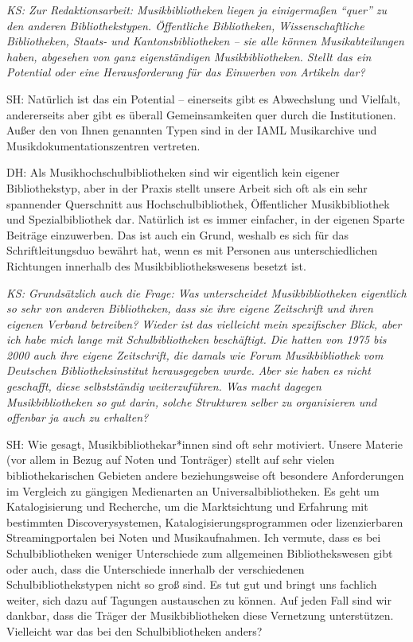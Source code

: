 \documentclass[a4paper,
fontsize=11pt,
oneside,
numbers=noperiodatend,
parskip=half-,
bibliography=totoc,
final
]{scrartcl}
\begin{document}
\emph{KS: Zur Redaktionsarbeit: Musikbibliotheken liegen ja einigermaßen
\enquote{quer} zu den anderen Bibliothekstypen. Öffentliche
Bibliotheken, Wissenschaftliche Bibliotheken, Staats- und
Kantonsbibliotheken -- sie alle können Musikabteilungen haben, abgesehen
von ganz eigenständigen Musikbibliotheken. Stellt das ein Potential oder
eine Herausforderung für das Einwerben von Artikeln dar?}

SH: Natürlich ist das ein Potential -- einerseits gibt es Abwechslung
und Vielfalt, andererseits aber gibt es überall Gemeinsamkeiten quer
durch die Institutionen. Außer den von Ihnen genannten Typen sind in der
IAML Musikarchive und Musikdokumentationszentren vertreten.

DH: Als Musikhochschulbibliotheken sind wir eigentlich kein eigener
Bibliothekstyp, aber in der Praxis stellt unsere Arbeit sich oft als ein
sehr spannender Querschnitt aus Hochschulbibliothek, Öffentlicher
Musikbibliothek und Spezialbibliothek dar. Natürlich ist es immer
einfacher, in der eigenen Sparte Beiträge einzuwerben. Das ist auch ein
Grund, weshalb es sich für das Schriftleitungsduo bewährt hat, wenn es
mit Personen aus unterschiedlichen Richtungen innerhalb des
Musikbibliothekswesens besetzt ist.

\emph{KS: Grundsätzlich auch die Frage: Was unterscheidet
Musikbibliotheken eigentlich so sehr von anderen Bibliotheken, dass sie
ihre eigene Zeitschrift und ihren eigenen Verband betreiben? Wieder ist
das vielleicht mein spezifischer Blick, aber ich habe mich lange mit
Schulbibliotheken beschäftigt. Die hatten von 1975 bis 2000 auch ihre
eigene Zeitschrift, die damals wie Forum Musikbibliothek vom Deutschen
Bibliotheksinstitut herausgegeben wurde. Aber sie haben es nicht
geschafft, diese selbstständig weiterzuführen. Was macht dagegen
Musikbibliotheken so gut darin, solche Strukturen selber zu organisieren
und offenbar ja auch zu erhalten?}

SH: Wie gesagt, Musikbibliothekar*innen sind oft sehr motiviert. Unsere
Materie (vor allem in Bezug auf Noten und Tonträger) stellt auf sehr
vielen bibliothekarischen Gebieten andere beziehungsweise oft besondere
Anforderungen im Vergleich zu gängigen Medienarten an
Universalbibliotheken. Es geht um Katalogisierung und Recherche, um die
Marktsichtung und Erfahrung mit bestimmten Discoverysystemen,
Katalogisierungsprogrammen oder lizenzierbaren Streamingportalen bei
Noten und Musikaufnahmen. Ich vermute, dass es bei Schulbibliotheken
weniger Unterschiede zum allgemeinen Bibliothekswesen gibt oder auch,
dass die Unterschiede innerhalb der verschiedenen Schulbibliothekstypen
nicht so groß sind. Es tut gut und bringt uns fachlich weiter, sich dazu
auf Tagungen austauschen zu können. Auf jeden Fall sind wir dankbar,
dass die Träger der Musikbibliotheken diese Vernetzung unterstützen.
Vielleicht war das bei den Schulbibliotheken anders?
\end{document}
